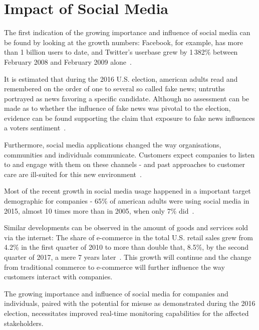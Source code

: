 \section{Impact of Social Media}
\label{sec:developmentOfSocialMedia}

The first indication of the growing importance and influence of social media can be found by looking at the growth numbers:
Facebook, for example, has more than 1 billion users to date, and Twitter's userbase grew by 1\,382\% between February 2008 and February 2009 alone~\cite{mcgiboney2009twitter}.
\par

It is estimated that during the 2016 U.S. election, american adults read and remembered on the order of one to several so called fake news;
untruths portrayed as news favoring a specific candidate.
Although no assessment can be made as to whether the influence of fake news was pivotal to the election,
evidence can be found supporting the claim that exposure to fake news influences a voters sentiment~\cite{Allcott2017}.
\par
Furthermore, social media applications changed the way organisations, communities and individuals communicate.
Customers expect companies to listen to and engage with them on these channels - and past approaches to customer care are ill-suited for this new environment~\cite{Kietzmann2011}.
\par
Most of the recent growth in social media usage happened in a important target demographic for companies -
65\% of american adults were using social media in 2015, almost 10 times more than in 2005, when only 7\% did~\cite{Perrin2015}.
\par
Similar developments can be observed in the amount of goods and services sold via the internet:
The share of e-commerce in the total U.S. retail sales grew from 4.2\% in the first quarter of 2010 to more than double that, 8.5\%,
by the second quarter of 2017, a mere 7 years later~\cite{statistaECommerceGrowth}.
This growth will continue and the change from traditional commerce to e-commerce
will further influence the way customers interact with companies.
\par
The growing importance and influence of social media for companies and individuals,
paired with the potential for misuse as demonstrated during the 2016 election,
necessitates improved real-time monitoring capabilities for the affected stakeholders.
\par
